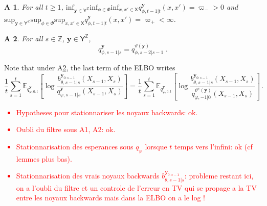 \documentclass{article}
\newcommand{\1}{\mathbbm{1}}
\newcommand{\Xset}{\mathsf{X}}
\def\Yset{\mathsf{Y}}
\def\1{\mathds{1}}
\newtheorem{assumptionA}{\textbf{A}\hspace{-3pt}}
\newcommand{\rmd}{\ensuremath{\mathrm{d}}}
\newcommand{\eqsp}{\;}
\newcommand{\shift}{\vartheta}
\newcommand{\bfy}{\mathbf{y}}
\newcommand{\Zset}{\mathbb{Z}}
\begin{document}
%


\begin{assumptionA}
\label{assum:transition:variational}
For all $t\geq 1$, $\mathrm{inf}_{\bfy\in\Yset^{\Zset}}\mathrm{inf}_{\phi\in\Phi}\mathrm{inf}_{x,x'\in\Xset} q^{\bfy}_{\phi,t-1|t}(x,x') = \varpi_->0$ and $\mathrm{sup}_{\bfy\in\Yset^{\Zset}}\mathrm{sup}_{\phi\in\Phi}\mathrm{sup}_{x,x'\in\Xset} q^{\bfy}_{\phi,t-1|t}(x,x') = \varpi_+<\infty$. 
\end{assumptionA}

\begin{assumptionA}
\label{assum:variational:shift}
For all $s\in \mathbb{Z}$, $\bfy\in\Yset^{\Zset}$, 
$$
q^{\bfy}_{\phi,s-1|s} = q^{\shift (\bfy)}_{\phi,s-2|s-1} \eqsp.
$$
\end{assumptionA}

Note that under A\ref{assum:variational:shift}, the last term of the ELBO writes
$$
\frac{1}{t}\sum_{s=1}^t\mathbb{E}_{q^{\bfy}_{\varphi,0:t}}\left[\log \frac{b^{\bfy_{0:s-1}}_{\theta,s-1|s}(X_{s-1},X_s)}{q^{\bfy}_{\varphi,s-1|s}(X_{s-1},X_s)}\right]=\frac{1}{t}\sum_{s=1}^t\mathbb{E}_{q^{\bfy}_{\varphi,0:t}}\left[\log \frac{b^{\bfy_{0:s-1}}_{\theta,s-1|s}(X_{s-1},X_s)}{q^{\shift^s(\bfy)}_{\varphi,-1|0}(X_{s-1},X_s)}\right]\,.
$$

\textcolor{red}{
\begin{itemize}
\item Hypotheses pour stationnariser les noyaux backwards: ok.
\item Oubli du filtre sous A1, A2: ok.
\item Stationnarisation des esperances sous $q_\varphi$ lorsque $t$ temps vers l'infini:  ok (cf lemmes plus bas).
\item Stationnarisation des vrais noyaux backwards $b^{\bfy_{0:s-1}}_{\theta,s-1|s}$: probleme restant ici, on a l'oubli du filtre et un controle de l'erreur en TV qui se propage a la TV entre les noyaux backwards mais dans la ELBO on a le log !
\end{itemize}}
\end{document}

